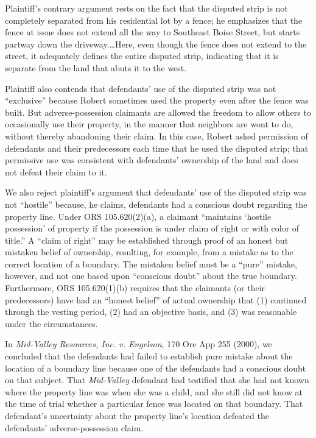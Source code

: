 Plaintiff's contrary argument rests on the fact that the disputed strip is not
completely separated from his residential lot by a fence; he emphasizes that
the fence at issue does not extend all the way to Southeast Boise Street, but
starts partway down the driveway.\ldots Here, even though the fence does not
extend to the street, it adequately defines the entire disputed strip,
indicating that it is separate from the land that abuts it to the west.

Plaintiff also contends that defendants' use of the disputed strip was not
``exclusive'' because Robert sometimes used the property even after the fence
was built. But adverse-possession claimants are allowed the freedom to allow
others to occasionally use their property, in the manner that neighbors are
wont to do, without thereby abandoning their claim. In this case, Robert asked
permission of defendants and their predecessors each time that he used the
disputed strip; that permissive use was consistent with defendants' ownership
of the land and does not defeat their claim to it.

We also reject plaintiff's argument that defendants' use of the disputed strip
was not ``hostile'' because, he claims, defendants had a conscious doubt
regarding the property line. Under ORS 105.620(2)(a), a claimant ``maintains
`hostile possession' of property if the possession is under claim of right or
with color of title.'' A ``claim of right'' may be established through proof of
an honest but mistaken belief of ownership, resulting, for example, from a
mistake as to the correct location of a boundary. The mistaken belief must be a
``pure'' mistake, however, and not one based upon ``conscious doubt'' about the
true boundary. Furthermore, ORS 105.620(1)(b) requires that the claimants (or
their predecessors) have had an ``honest belief'' of actual ownership that (1)
continued through the vesting period, (2) had an objective basis, and (3) was
reasonable under the circumstances.

In \textit{Mid-Valley Resources, Inc. v. Engelson}, 170 Ore App 255 (2000), we
concluded that the defendants had failed to establish pure mistake about the
location of a boundary line because one of the defendants had a conscious doubt
on that subject. That \textit{Mid-Valley} defendant had testified that she had
not known where the property line was when she was a child, and she still did
not know at the time of trial whether a particular fence was located on that
boundary. That defendant's uncertainty about the property line's location
defeated the defendants' adverse-possession claim.

